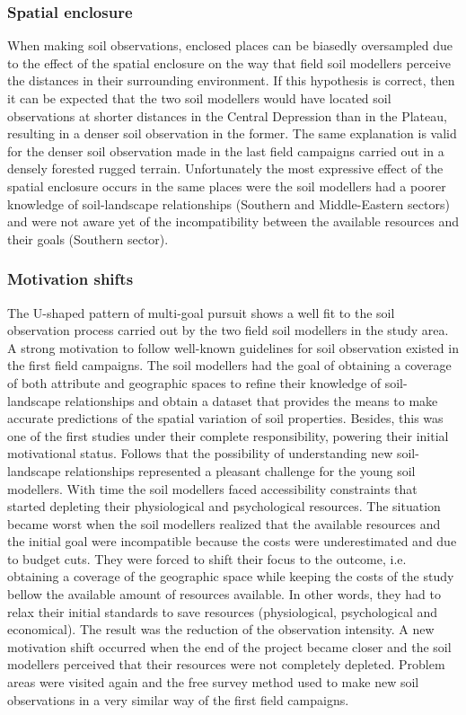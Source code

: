\subsubsection{Spatial enclosure}

When making soil observations, enclosed places can be biasedly oversampled due to the effect of the spatial 
enclosure on the way that field soil modellers perceive the distances in their surrounding environment. If 
this hypothesis is correct, then it can be expected that the two soil modellers would have located soil 
observations at shorter distances in the Central Depression than in the Plateau, resulting in a denser soil 
observation in the former. The same explanation is valid for the denser soil observation made in the last field
campaigns carried out in a densely forested rugged terrain. Unfortunately the most expressive effect of the 
spatial enclosure occurs in the same places were the soil modellers had a poorer knowledge of soil-landscape 
relationships (Southern and Middle-Eastern sectors) and were not aware yet of the incompatibility between the 
available resources and their goals (Southern sector).

\subsubsection{Motivation shifts}

The U-shaped pattern of multi-goal pursuit shows a well fit to the soil observation process carried out by the 
two field soil modellers in the study area. A strong motivation to follow well-known guidelines for soil 
observation existed in the first field campaigns. The soil modellers had the goal of obtaining a coverage of 
both attribute and geographic spaces to refine their knowledge of soil-landscape relationships and obtain a 
dataset that provides the means to make accurate predictions of the spatial variation of soil properties. 
Besides, this was one of the first studies under their complete responsibility, powering their initial 
motivational status. Follows that the possibility of understanding new soil-landscape relationships represented
a pleasant challenge for the young soil modellers. With time the soil modellers faced accessibility 
constraints that started depleting their physiological and psychological resources. The situation became worst 
when the soil modellers realized that the available resources and the initial goal were incompatible because 
the costs were underestimated and due to budget cuts. They were forced to shift their focus to the outcome, 
i.e. obtaining a  coverage of the geographic space while keeping the costs of the study 
bellow the available amount of resources available. In other words, they had to relax their initial standards 
to save resources (physiological, psychological and economical). The result was the reduction of the 
observation intensity. A new motivation shift occurred when the end of the project became closer and the soil 
modellers perceived that their resources were not completely depleted. Problem areas were visited again and the 
free survey method used to make new soil observations in a very similar way of the first field campaigns.

